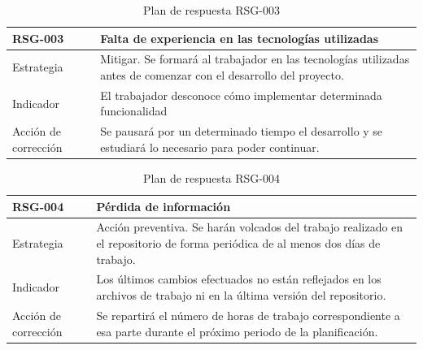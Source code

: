 \begin{table}[htpb]
\centering
\begin{tabularx}{\textwidth}{|l|X|}
\hline
\rowcolor[gray]{0.9}\textbf{RSG-003}              & \textbf{Falta de experiencia en las tecnologías utilizadas}                                                                \\ \hline
Estrategia & Mitigar. Se formará al trabajador en las tecnologías utilizadas antes de comenzar con el desarrollo del proyecto. \\ \hline
Indicador            & El trabajador desconoce cómo implementar determinada funcionalidad                                                \\ \hline
Acción de corrección & Se pausará por un determinado tiempo el desarrollo y se estudiará lo necesario para poder continuar.              \\ \hline
\end{tabularx}
\caption{Plan de respuesta RSG-003}
\end{table}


\begin{table}[htpb]
\centering
\begin{tabularx}{\textwidth}{|l|X|}
\hline
\rowcolor[gray]{0.9}\textbf{RSG-004}              & \textbf{Pérdida de información}                                                                                                  \\ \hline
Estrategia & Acción preventiva. Se harán volcados del trabajo realizado en el repositorio de forma periódica de al menos dos días de trabajo.  \\ \hline
Indicador            & Los últimos cambios efectuados no están reflejados en los archivos de trabajo ni en la última versión del repositorio. \\ \hline
Acción de corrección & Se repartirá el número de horas de trabajo correspondiente a esa parte durante el próximo periodo de la planificación.  \\ \hline
\end{tabularx}
\caption{Plan de respuesta RSG-004}
\end{table}


